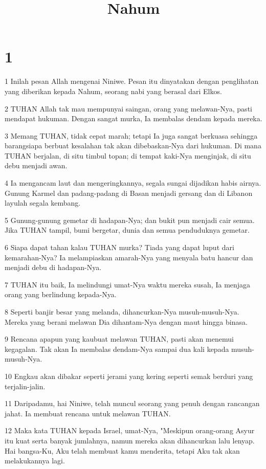

\title{Nahum}


\chapter{1}

\par 1 Inilah pesan Allah mengenai Niniwe. Pesan itu dinyatakan dengan penglihatan yang diberikan kepada Nahum, seorang nabi yang berasal dari Elkos.
\par 2 TUHAN Allah tak mau mempunyai saingan, orang yang melawan-Nya, pasti mendapat hukuman. Dengan sangat murka, Ia membalas dendam kepada mereka.
\par 3 Memang TUHAN, tidak cepat marah; tetapi Ia juga sangat berkuasa sehingga barangsiapa berbuat kesalahan tak akan dibebaskan-Nya dari hukuman. Di mana TUHAN berjalan, di situ timbul topan; di tempat kaki-Nya menginjak, di situ debu menjadi awan.
\par 4 Ia mengancam laut dan mengeringkannya, segala sungai dijadikan habis airnya. Gunung Karmel dan padang-padang di Basan menjadi gersang dan di Libanon layulah segala kembang.
\par 5 Gunung-gunung gemetar di hadapan-Nya; dan bukit pun menjadi cair semua. Jika TUHAN tampil, bumi bergetar, dunia dan semua penduduknya gemetar.
\par 6 Siapa dapat tahan kalau TUHAN murka? Tiada yang dapat luput dari kemarahan-Nya? Ia melampiaskan amarah-Nya yang menyala batu hancur dan menjadi debu di hadapan-Nya.
\par 7 TUHAN itu baik, Ia melindungi umat-Nya waktu mereka susah, Ia menjaga orang yang berlindung kepada-Nya.
\par 8 Seperti banjir besar yang melanda, dihancurkan-Nya musuh-musuh-Nya. Mereka yang berani melawan Dia dihantam-Nya dengan maut hingga binasa.
\par 9 Rencana apapun yang kaubuat melawan TUHAN, pasti akan menemui kegagalan. Tak akan Ia membalas dendam-Nya sampai dua kali kepada musuh-musuh-Nya.
\par 10 Engkau akan dibakar seperti jerami yang kering seperti semak berduri yang terjalin-jalin.
\par 11 Daripadamu, hai Niniwe, telah muncul seorang yang penuh dengan rancangan jahat. Ia membuat rencana untuk melawan TUHAN.
\par 12 Maka kata TUHAN kepada Israel, umat-Nya, "Meskipun orang-orang Asyur itu kuat serta banyak jumlahnya, namun mereka akan dihancurkan lalu lenyap. Hai bangsa-Ku, Aku telah membuat kamu menderita, tetapi Aku tak akan melakukannya lagi.
